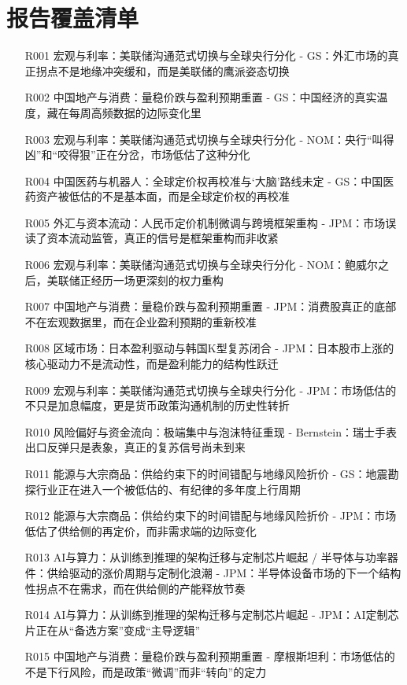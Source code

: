 \documentclass[11pt]{ctexart}
\begin{document}
\section{报告覆盖清单}
\begin{itemize}
  \item [R001] 宏观与利率：美联储沟通范式切换与全球央行分化 - GS：外汇市场的真正拐点不是地缘冲突缓和，而是美联储的鹰派姿态切换
  \item [R002] 中国地产与消费：量稳价跌与盈利预期重置 - GS：中国经济的真实温度，藏在每周高频数据的边际变化里
  \item [R003] 宏观与利率：美联储沟通范式切换与全球央行分化 - NOM：央行“叫得凶”和“咬得狠”正在分岔，市场低估了这种分化
  \item [R004] 中国医药与机器人：全球定价权再校准与‘大脑’路线未定 - GS：中国医药资产被低估的不是基本面，而是全球定价权的再校准
  \item [R005] 外汇与资本流动：人民币定价机制微调与跨境框架重构 - JPM：市场误读了资本流动监管，真正的信号是框架重构而非收紧
  \item [R006] 宏观与利率：美联储沟通范式切换与全球央行分化 - NOM：鲍威尔之后，美联储正经历一场更深刻的权力重构
  \item [R007] 中国地产与消费：量稳价跌与盈利预期重置 - JPM：消费股真正的底部不在宏观数据里，而在企业盈利预期的重新校准
  \item [R008] 区域市场：日本盈利驱动与韩国K型复苏闭合 - JPM：日本股市上涨的核心驱动力不是流动性，而是盈利能力的结构性跃迁
  \item [R009] 宏观与利率：美联储沟通范式切换与全球央行分化 - JPM：市场低估的不只是加息幅度，更是货币政策沟通机制的历史性转折
  \item [R010] 风险偏好与资金流向：极端集中与泡沫特征重现 - Bernstein：瑞士手表出口反弹只是表象，真正的复苏信号尚未到来
  \item [R011] 能源与大宗商品：供给约束下的时间错配与地缘风险折价 - GS：地震勘探行业正在进入一个被低估的、有纪律的多年度上行周期
  \item [R012] 能源与大宗商品：供给约束下的时间错配与地缘风险折价 - JPM：市场低估了供给侧的再定价，而非需求端的边际变化
  \item [R013] AI与算力：从训练到推理的架构迁移与定制芯片崛起 / 半导体与功率器件：供给驱动的涨价周期与定制化浪潮 - JPM：半导体设备市场的下一个结构性拐点不在需求，而在供给侧的产能释放节奏
  \item [R014] AI与算力：从训练到推理的架构迁移与定制芯片崛起 - JPM：AI定制芯片正在从“备选方案”变成“主导逻辑”
  \item [R015] 中国地产与消费：量稳价跌与盈利预期重置 - 摩根斯坦利：市场低估的不是下行风险，而是政策“微调”而非“转向”的定力

\end{itemize}
\end{document}

